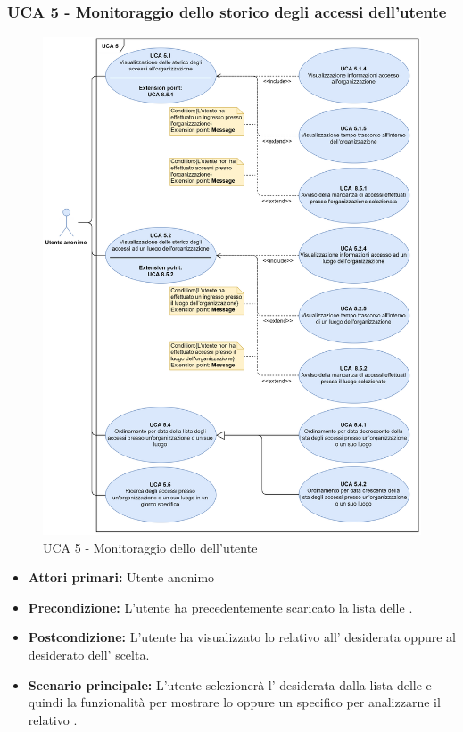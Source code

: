 \clearpage
\subsubsection{UCA 5 - Monitoraggio dello storico degli accessi dell'utente}

\begin{figure}[h]
	\centering	
	\includegraphics[scale=0.6]{Sezioni/UseCase/Immagini/UCA5.png}
	\caption{UCA 5 - Monitoraggio dello  dell'utente}
\end{figure}

\begin{itemize}
    \item \textbf{Attori primari:} Utente anonimo
    \item \textbf{Precondizione:} L'utente ha precedentemente scaricato la lista delle .
    \item \textbf{Postcondizione:} L'utente ha visualizzato lo  relativo all' desiderata oppure al  desiderato dell' scelta.
    \item \textbf{Scenario principale:} L'utente selezionerà l' desiderata dalla lista delle  e quindi la funzionalità per mostrare lo  oppure un  specifico per analizzarne il relativo .
\end{itemize}

